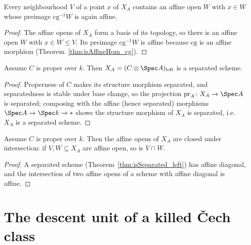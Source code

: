 \begin{theorem}
  \label{thm:exists_isAffineOpen_cg_le}
  \leanok
  Every neighbourhood \(V\) of a point \(x\) of \(X_A\) contains an affine open \(W\) with \(x \in
  W\) whose preimage \(\mathrm{cg}^{-1}W\) is again affine.
\end{theorem}
\begin{proof}
  \leanok
  The affine opens of \(X_A\) form a basis of its topology, so there is an affine open \(W\) with
  \(x \in W \le V\). Its preimage \(\mathrm{cg}^{-1}W\) is affine because \(\mathrm{cg}\) is an
  affine morphism (Theorem~\ref{thm:isAffineHom_cg}).
\end{proof}

\begin{theorem}
  \label{thm:isSeparated_left}
  \leanok
  Assume \(C\) is proper over \(k\). Then \(X_A = (C \otimes \Spec A)_{\mathrm{left}}\) is a
  separated scheme.
\end{theorem}
\begin{proof}
  \leanok
  Properness of \(C\) makes its structure morphism separated, and separatedness is stable under
  base change, so the projection \(\mathrm{pr}_A \colon X_A \to \Spec A\) is separated; composing
  with the affine (hence separated) morphisms \(\Spec A \to \Spec k \to \ast\) shows the structure
  morphism of \(X_A\) is separated, i.e.\ \(X_A\) is a separated scheme.
\end{proof}

\begin{theorem}
  \label{thm:isAffineOpen_inf}
  \leanok
  Assume \(C\) is proper over \(k\). Then the affine opens of \(X_A\) are closed under
  intersection: if \(V, W \subseteq X_A\) are affine open, so is \(V \cap W\).
\end{theorem}
\begin{proof}
  \leanok
  A separated scheme (Theorem~\ref{thm:isSeparated_left}) has affine diagonal, and the
  intersection of two affine opens of a scheme with affine diagonal is affine.
\end{proof}

\section{The descent unit of a killed \v Cech class}
\label{sec:kernelDescentUnit}

